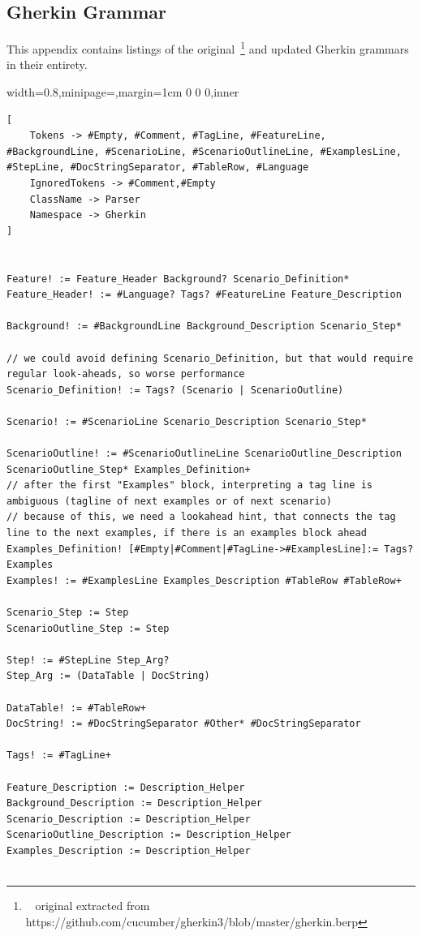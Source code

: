 \documentclass[dissertation,final]{softeng}
\newenvironment{featurecode}[1]
{ \lrbox\featurebox \begin{adjustbox}{width=#1\textwidth,minipage=\textwidth,margin=1cm 0 0 0,inner} }
{ \end{adjustbox}\endlrbox}
\newenvironment{featurelist}[2]
{
\newcommand{\setcaption}{\caption{#1}}
\newcommand{\setlabel}{\label{#2}}
}
{\begin{listing}[h!]\centering\usebox\featurebox\setcaption\setlabel\end{listing}}
\begin{document}
\begin{appendices}
\chapter{Gherkin Grammar}
This appendix contains listings of the original~\footnote{~ original extracted from https://github.com/cucumber/gherkin3/blob/master/gherkin.berp} and updated Gherkin grammars in their entirety.

\begin{featurelist}{Original gherkin grammar}{lst:original_gherkin_grammar}
\begin{featurecode}{0.8}
\begin{verbatim}
[
	Tokens -> #Empty, #Comment, #TagLine, #FeatureLine, #BackgroundLine, #ScenarioLine, #ScenarioOutlineLine, #ExamplesLine, #StepLine, #DocStringSeparator, #TableRow, #Language
	IgnoredTokens -> #Comment,#Empty
	ClassName -> Parser
	Namespace -> Gherkin
]


Feature! := Feature_Header Background? Scenario_Definition*
Feature_Header! := #Language? Tags? #FeatureLine Feature_Description

Background! := #BackgroundLine Background_Description Scenario_Step*

// we could avoid defining Scenario_Definition, but that would require regular look-aheads, so worse performance
Scenario_Definition! := Tags? (Scenario | ScenarioOutline)

Scenario! := #ScenarioLine Scenario_Description Scenario_Step*

ScenarioOutline! := #ScenarioOutlineLine ScenarioOutline_Description ScenarioOutline_Step* Examples_Definition+
// after the first "Examples" block, interpreting a tag line is ambiguous (tagline of next examples or of next scenario)
// because of this, we need a lookahead hint, that connects the tag line to the next examples, if there is an examples block ahead
Examples_Definition! [#Empty|#Comment|#TagLine->#ExamplesLine]:= Tags? Examples
Examples! := #ExamplesLine Examples_Description #TableRow #TableRow+

Scenario_Step := Step
ScenarioOutline_Step := Step

Step! := #StepLine Step_Arg?
Step_Arg := (DataTable | DocString)

DataTable! := #TableRow+
DocString! := #DocStringSeparator #Other* #DocStringSeparator

Tags! := #TagLine+

Feature_Description := Description_Helper
Background_Description := Description_Helper
Scenario_Description := Description_Helper
ScenarioOutline_Description := Description_Helper
Examples_Description := Description_Helper


\end{verbatim}
\end{featurecode}
\end{featurelist}
\end{appendices}
\end{document}

